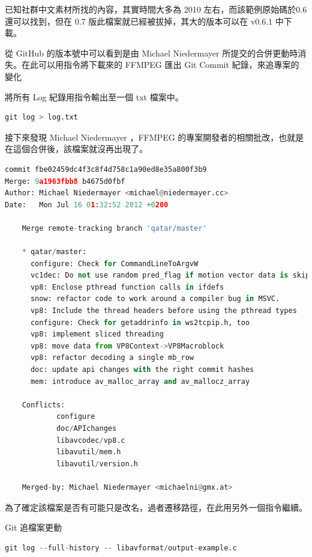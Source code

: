 \documentclass[10pt,UTF8]{ctexart}
\begin{document}
已知社群中文素材所找的內容，其實時間大多為 2010 左右，而該範例原始碼於0.6 還可以找到，但在 0.7 版此檔案就已經被拔掉，其大的版本可以在 v0.6.1 中下載。

從 GitHub 的版本號中可以看到是由 Michael Niedermayer 所提交的合併更動時消失。在此可以用指令將下載來的 FFMPEG 匯出 Git Commit 紀錄，來追專案的變化

將所有 Log 紀錄用指令輸出至一個 txt 檔案中。

\begin{lstlisting}[language={python}]
git log > log.txt
\end{lstlisting}

接下來發現 Michael Niedermayer ，FFMPEG 的專案開發者的相關批改，也就是在這個合併後，該檔案就沒再出現了。

\begin{lstlisting}[language={python}]
commit fbe02459dc4f3c8f4d758c1a90ed8e35a800f3b9
Merge: 9a1963fbb8 b4675d0fbf
Author: Michael Niedermayer <michael@niedermayer.cc>
Date:   Mon Jul 16 01:32:52 2012 +0200

    Merge remote-tracking branch 'qatar/master'
    
    * qatar/master:
      configure: Check for CommandLineToArgvW
      vc1dec: Do not use random pred_flag if motion vector data is skipped
      vp8: Enclose pthread function calls in ifdefs
      snow: refactor code to work around a compiler bug in MSVC.
      vp8: Include the thread headers before using the pthread types
      configure: Check for getaddrinfo in ws2tcpip.h, too
      vp8: implement sliced threading
      vp8: move data from VP8Context->VP8Macroblock
      vp8: refactor decoding a single mb_row
      doc: update api changes with the right commit hashes
      mem: introduce av_malloc_array and av_mallocz_array
    
    Conflicts:
            configure
            doc/APIchanges
            libavcodec/vp8.c
            libavutil/mem.h
            libavutil/version.h
    
    Merged-by: Michael Niedermayer <michaelni@gmx.at>
\end{lstlisting}

為了確定該檔案是否有可能只是改名，過者遷移路徑，在此用另外一個指令繼續。

Git 追檔案更動

\begin{lstlisting}[language={python}]
git log --full-history -- libavformat/output-example.c
\end{lstlisting}
\end{document}
